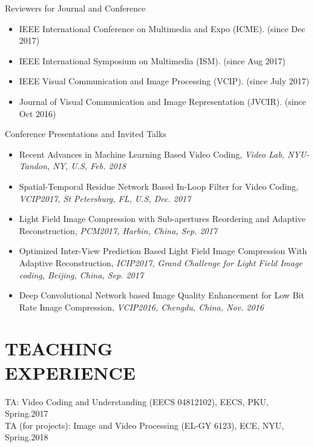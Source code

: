 \documentclass[margin, 10pt]{res} %
\begin{document}
\begin{resume}
Reviewers for Journal and Conference
\begin{itemize} \itemsep -2pt
\item{IEEE International Conference on Multimedia and Expo (ICME). (since Dec 2017)}
\item{IEEE International Symposium on Multimedia (ISM). (since Aug 2017)}
\item{IEEE Visual Communication and Image Processing (VCIP). (since July 2017)}
\item{Journal of Visual Communication and Image Representation (JVCIR). (since Oct  2016)}
\end{itemize}

Conference Presentations and Invited Talks
\begin{itemize} \itemsep -2pt
\item{Recent Advances in Machine Learning Based Video Coding, {\em Video Lab, NYU-Tandon, NY, U.S, Feb. 2018}}
\item{Spatial-Temporal Residue Network Based In-Loop Filter for Video Coding, {\em VCIP2017, St Petersburg, FL, U.S, Dec. 2017}}
\item{Light Field Image Compression with Sub-apertures Reordering and Adaptive Reconstruction, {\em PCM2017, Harbin, China, Sep. 2017}}
\item{Optimized Inter-View Prediction Based Light Field Image Compression With Adaptive Reconstruction, {\em ICIP2017, Grand Challenge for Light Field Image coding, Beijing, China, Sep. 2017}}
\item{Deep Convolutional Network based Image Quality Enhancement for Low Bit Rate Image Compression, {\em VCIP2016, Chengdu, China, Nov. 2016}}
\end{itemize}


\section{TEACHING \\ EXPERIENCE}

TA: Video Coding and Understanding (EECS 04812102), EECS, PKU, \hfill Spring.2017 \\
TA (for projects): Image and Video Processing (EL-GY 6123), ECE, NYU, \hfill Spring.2018 \\



\end{resume}
\end{document}

